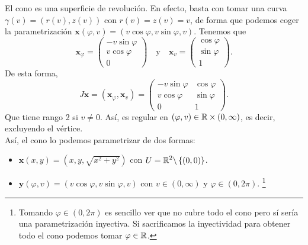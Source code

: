 \begin{eg}
El cono es una superficie de revolución. En efecto, basta con tomar una curva $\displaystyle \gamma\left(v\right)= \left(r\left(v\right), z\left(v\right)\right) $ con $\displaystyle r \left(v\right)=z\left(v\right)=v $, de forma que podemos coger la parametrización $\displaystyle \textbf{x} \left(\varphi, v\right)=\left(v\cos\varphi, v\sin\varphi,v\right) $. Tenemos que 
\[ \textbf{x} _{\varphi}=\begin{pmatrix} -v\sin\varphi \\ v \cos \varphi \\ 0 \end{pmatrix}\quad \text{y} \quad \textbf{x} _{v}=\begin{pmatrix} \cos \varphi \\ \sin\varphi \\ 1 \end{pmatrix} .\]
De esta forma, 
\[J \textbf{x} =\left( \textbf{x} _{\varphi}, \textbf{x} _{v}\right)=\begin{pmatrix} -v\sin\varphi & \cos \varphi\\ v\cos \varphi & \sin \varphi \\ 0 & 1 \end{pmatrix} .\]
Que tiene rango 2 si $\displaystyle v \neq 0 $. Así, es regular en $\displaystyle \left(\varphi, v\right)\in \mathbb{R} \times \left(0,\infty \right) $, es decir, excluyendo el vértice.  \\
Así, el cono lo podemos parametrizar de dos formas: 
\begin{itemize}
\item $\displaystyle \textbf{x} \left(x,y\right)=\left(x,y,\sqrt{x^{2}+y^{2}}\right) $ con $\displaystyle U = \mathbb{R}^{2} \backslash \left\{ \left(0,0\right)\right\}  $.
\item $\displaystyle \textbf{y} \left(\varphi, v\right)=\left(v\cos\varphi, v\sin\varphi, v\right) $ con $\displaystyle v \in \left(0, \infty\right) $ y $\displaystyle \varphi \in \left(0,2\pi \right) $. \footnote{Tomando $\displaystyle \varphi \in \left(0,2\pi \right) $ es sencillo ver que no cubre todo el cono pero sí sería una parametrización inyectiva. Si sacrificamos la inyectividad para obtener todo el cono podemos tomar $\displaystyle \varphi \in \mathbb{R} $.} 
\end{itemize}
\end{eg}

